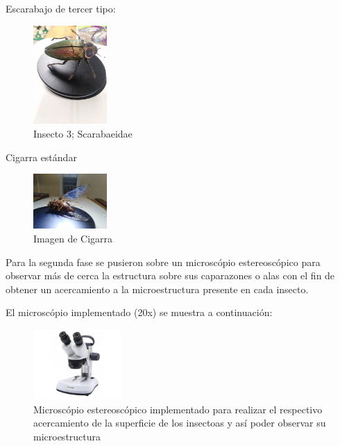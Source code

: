 \documentclass[a4paper, twocolumn, 10pt]{article}
\begin{document}
\noindent Escarabajo de tercer tipo: 

\begin{figure}[H]
    \centering
    \includegraphics[width = 0.25\textwidth]{insecto3.jpg}
    \caption{Insecto 3; Scarabaeidae}
    \label{tipos}
\end{figure}

\noindent Cigarra estándar


\begin{figure}[H]
    \centering
    \includegraphics[width = 0.25\textwidth]{cigarra.jpg}
    \caption{Imagen de Cigarra}
    \label{tipos}
\end{figure}

\noindent Para la segunda fase se pusieron sobre un microscópio estereoscópico para observar más de cerca la estructura sobre sus caparazones o alas con el fin de obtener un acercamiento a la microestructura presente en cada insecto.

El microscópio implementado (20x) se muestra a continuación:



\begin{figure}[H]
    \centering
    \includegraphics[width = 0.3\textwidth]{estereo.jpg}
    \caption{Microscópio estereoscópico implementado para realizar el respectivo acercamiento de la superficie de los insectoas y así poder observar su microestructura}
    \label{tipos}
\end{figure}
\end{document}
